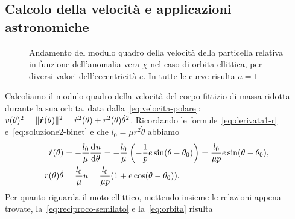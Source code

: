 \subsection{Calcolo della velocità e applicazioni astronomiche}
\label{sec:velocita}
\begin{figure}
  \centering
  
  \caption[Andamento della velocità in funzione dell'anomalia vera]{Andamento
    del modulo quadro della velocità della particella relativa in funzione
    dell'anomalia vera $\chi$ nel caso di orbita ellittica, per diversi valori
    dell'eccentricità $e$. In tutte le curve risulta $a=1$}
  \label{fig:velocita}
\end{figure}
Calcoliamo il modulo quadro della velocità del corpo fittizio di massa ridotta
durante la sua orbita, data dalla~\eqref{eq:velocita-polare}: $v(\theta)^2 =
\lVert\dot{\bm{r}}(\theta)\rVert^2 = \dot{r}^2(\theta) +
r^2(\theta)\dot{\theta}^2$. Ricordando le formule~\eqref{eq:derivata1-r}
e~\eqref{eq:soluzione2-binet} e che $l_0=\mu r^2\dot{\theta}$ abbiamo
\begin{subequations}
  \begin{align}
    \dot{r}(\theta) &= -\frac{l_0}{\mu}\frac{{\mathop{}\!\mathrm{d}^{}}u}{\mathop{}\!\mathrm{d} {\theta}^{}} = -\frac{l_0}{\mu}
    \left( -\frac{1}{p}e\sin(\theta-\theta_0) \right) = \frac{l_0}{\mu p}e
    \sin(\theta -
    \theta_0), \label{eq:velocita-radiale}\\
    r(\theta)\dot{\theta} &= \frac{l_0}{\mu}u =
    \frac{l_0}{\mu p}(1+e\cos(\theta-\theta_0)). \label{eq:velocita-tangenziale}
  \end{align}
\end{subequations}
Per quanto riguarda il moto ellittico, mettendo insieme le relazioni appena
trovate, la~\eqref{eq:reciproco-semilato} e la~\eqref{eq:orbita} risulta
